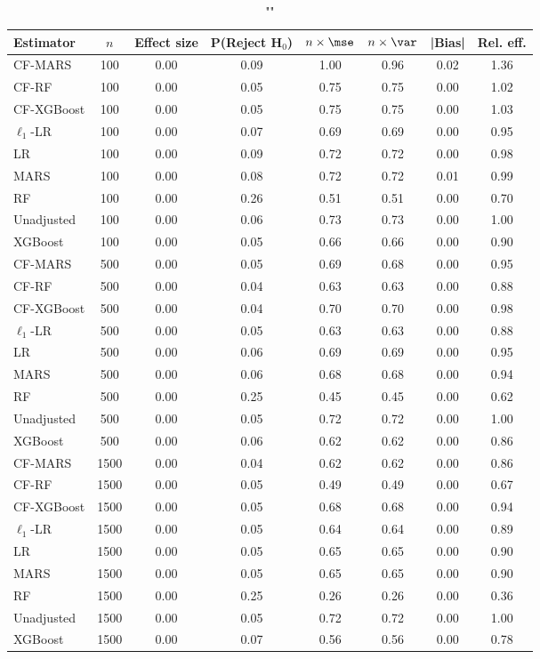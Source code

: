 \begin{table}
\centering
\caption{""}
\begin{tabular}{lccccccc}
\toprule
Estimator & $n$ & Effect size & P(Reject H$_0$) & $n\times\mse$ & $n\times \var$ & |Bias| & Rel. eff.\\ \midrule
CF-MARS & 100 & 0.00 & 0.09 & 1.00 & 0.96 & 0.02 & 1.36 \\ 
CF-RF & 100 & 0.00 & 0.05 & 0.75 & 0.75 & 0.00 & 1.02 \\ 
CF-XGBoost & 100 & 0.00 & 0.05 & 0.75 & 0.75 & 0.00 & 1.03 \\ 
$\ell_1$-LR & 100 & 0.00 & 0.07 & 0.69 & 0.69 & 0.00 & 0.95 \\ 
LR & 100 & 0.00 & 0.09 & 0.72 & 0.72 & 0.00 & 0.98 \\ 
MARS & 100 & 0.00 & 0.08 & 0.72 & 0.72 & 0.01 & 0.99 \\ 
RF & 100 & 0.00 & 0.26 & 0.51 & 0.51 & 0.00 & 0.70 \\ 
Unadjusted & 100 & 0.00 & 0.06 & 0.73 & 0.73 & 0.00 & 1.00 \\ 
XGBoost & 100 & 0.00 & 0.05 & 0.66 & 0.66 & 0.00 & 0.90 \\ \addlinespace 
CF-MARS & 500 & 0.00 & 0.05 & 0.69 & 0.68 & 0.00 & 0.95 \\ 
CF-RF & 500 & 0.00 & 0.04 & 0.63 & 0.63 & 0.00 & 0.88 \\ 
CF-XGBoost & 500 & 0.00 & 0.04 & 0.70 & 0.70 & 0.00 & 0.98 \\ 
$\ell_1$-LR & 500 & 0.00 & 0.05 & 0.63 & 0.63 & 0.00 & 0.88 \\ 
LR & 500 & 0.00 & 0.06 & 0.69 & 0.69 & 0.00 & 0.95 \\ 
MARS & 500 & 0.00 & 0.06 & 0.68 & 0.68 & 0.00 & 0.94 \\ 
RF & 500 & 0.00 & 0.25 & 0.45 & 0.45 & 0.00 & 0.62 \\ 
Unadjusted & 500 & 0.00 & 0.05 & 0.72 & 0.72 & 0.00 & 1.00 \\ 
XGBoost & 500 & 0.00 & 0.06 & 0.62 & 0.62 & 0.00 & 0.86 \\ \addlinespace 
CF-MARS & 1500 & 0.00 & 0.04 & 0.62 & 0.62 & 0.00 & 0.86 \\ 
CF-RF & 1500 & 0.00 & 0.05 & 0.49 & 0.49 & 0.00 & 0.67 \\ 
CF-XGBoost & 1500 & 0.00 & 0.05 & 0.68 & 0.68 & 0.00 & 0.94 \\ 
$\ell_1$-LR & 1500 & 0.00 & 0.05 & 0.64 & 0.64 & 0.00 & 0.89 \\ 
LR & 1500 & 0.00 & 0.05 & 0.65 & 0.65 & 0.00 & 0.90 \\ 
MARS & 1500 & 0.00 & 0.05 & 0.65 & 0.65 & 0.00 & 0.90 \\ 
RF & 1500 & 0.00 & 0.25 & 0.26 & 0.26 & 0.00 & 0.36 \\ 
Unadjusted & 1500 & 0.00 & 0.05 & 0.72 & 0.72 & 0.00 & 1.00 \\ 
XGBoost & 1500 & 0.00 & 0.07 & 0.56 & 0.56 & 0.00 & 0.78 \\
\bottomrule
\end{tabular}
\end{table}

